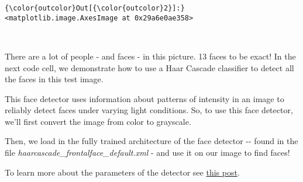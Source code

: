 \documentclass[11pt]{article}
\begin{document}
\begin{Verbatim}[commandchars=\\\{\}]
{\color{outcolor}Out[{\color{outcolor}2}]:} <matplotlib.image.AxesImage at 0x29a6e0ae358>
\end{Verbatim}
            
    \begin{center}
    \end{center}
    { \hspace*{\fill} \\}
    
    There are a lot of people - and faces - in this picture. 13 faces to be
exact! In the next code cell, we demonstrate how to use a Haar Cascade
classifier to detect all the faces in this test image.

This face detector uses information about patterns of intensity in an
image to reliably detect faces under varying light conditions. So, to
use this face detector, we'll first convert the image from color to
grayscale.

Then, we load in the fully trained architecture of the face detector
-\/- found in the file \emph{haarcascade\_frontalface\_default.xml} -
and use it on our image to find faces!

To learn more about the parameters of the detector see
\href{https://stackoverflow.com/questions/20801015/recommended-values-for-opencv-detectmultiscale-parameters}{this
post}.
\end{document}
